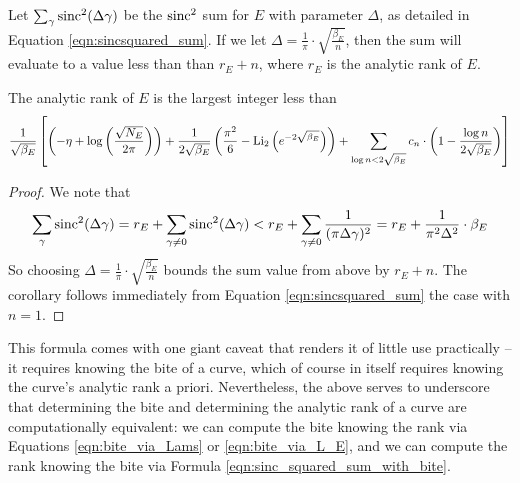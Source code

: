\begin{theorem}[GRH]\label{thm:sinc_squared_sum_with_bite}
Let $\sum_{\gamma} \operatorname{sinc}^2(\Delta \gamma)$ be the $\operatorname{sinc}^2$ sum for $E$ with parameter $\Delta$, as detailed in Equation \ref{eqn:sincsquared_sum}. If we let $\Delta = \frac{1}{\pi}\cdot \sqrt{\frac{\beta_E}{n}}$, then the sum will evaluate to a value less than than $r_E+n$, where $r_E$ is the analytic rank of $E$.
\end{theorem}
\begin{corollary}[GRH]\label{cor:sinc_squared_sum_with_bite}
The analytic rank of $E$ is the largest integer less than
\begin{equation}\label{eqn:sinc_squared_sum_with_bite}
\frac{1}{\sqrt{\beta_E}}\left[\left(-\eta + \log\left(\frac{\sqrt{N_E}}{2\pi}\right)\right)+ \frac{1}{2 \sqrt{\beta_E}}\left(\frac{\pi^2}{6} - \operatorname{Li}_2\left(e^{-2\sqrt{\beta_E}}\right)\right) + \sum_{\log n<2\sqrt{\beta_E}} c_n \cdot \left(1-\frac{\log n}{2\sqrt{\beta_E}}\right)\right]
\end{equation}
\end{corollary}
\begin{proof}
We note that 
\begin{equation}
\sum_{\gamma} \operatorname{sinc}^2(\Delta \gamma) = r_E + \sum_{\gamma\ne 0} \operatorname{sinc}^2(\Delta \gamma) <  r_E + \sum_{\gamma\ne 0} \frac{1}{(\pi \Delta \gamma)^2} = r_E + \frac{1}{\pi^2 \Delta^2} \cdot \beta_E
\end{equation}
So choosing $\Delta = \frac{1}{\pi}\cdot \sqrt{\frac{\beta_E}{n}}$ bounds the sum value from above by $r_E + n$. The corollary follows immediately from Equation \ref{eqn:sincsquared_sum} the case with $n=1$.
\end{proof}

This formula comes with one giant caveat that renders it of little use practically -- it requires knowing the bite of a curve, which of course in itself requires knowing the curve's analytic rank a priori. Nevertheless, the above serves to underscore that determining the bite and determining the analytic rank of a curve are computationally equivalent: we can compute the bite knowing the rank via Equations \ref{eqn:bite_via_Lams} or \ref{eqn:bite_via_L_E}, and we can compute the rank knowing the bite via Formula \ref{eqn:sinc_squared_sum_with_bite}. \\

